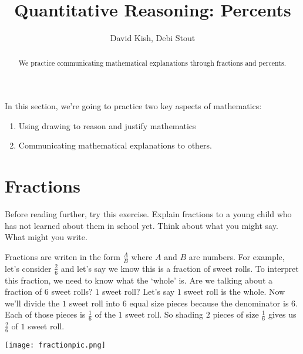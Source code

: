 \documentclass{ximera}
\author{David Kish, Debi Stout}
\title{Quantitative Reasoning: Percents}
\begin{document}
\begin{abstract}
We practice communicating mathematical explanations through fractions and percents.
\end{abstract}
\maketitle


In this section, we're going to practice two key aspects of mathematics: 
\begin{enumerate}
\item Using drawing to reason and justify mathematics
\item Communicating mathematical explanations to others.
\end{enumerate}

\section{Fractions}

\begin{exploration}
Before reading further, try this exercise.  Explain fractions to a young child who has not learned about them in school yet.  Think about what you might say.  What might you write.
\end{exploration}

Fractions are writen in the form $\frac{A}{B}$ where $A$ and $B$ are numbers. For example, let's consider $\frac{2}{6}$ and let's say we know this is a fraction of sweet rolls.  To interpret this fraction, we need to know what the `whole' is.   Are we talking about a fraction of $6$ sweet rolls? $1$ sweet roll? Let's say $1$ sweet roll is the whole. Now we'll divide the $1$ sweet roll into $6$ equal size pieces because the denominator is $6$. Each of those pieces is $\frac{1}{6}$ of the $1$ sweet roll. So shading $2$ pieces of size $\frac{1}{6}$ gives us $\frac{2}{6}$ of $1$ sweet roll.

\begin{image}
    \texttt{[image: fractionpic.png]}
\end{image}
\end{document}
